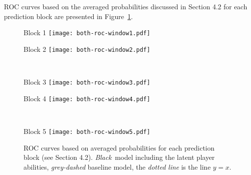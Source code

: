 \documentclass[11pt,a4paper]{article}
\begin{document}
ROC curves based on the averaged probabilities discussed in Section 4.2 
for each prediction block are presented in Figure~\ref{app_rocfig}.


\begin{figure}%
\hspace{-1.2cm}
\begin{minipage}[b]{0.48\linewidth}
        \centering
        \qquad\qquad\qquad\quad Block 1\vspace{0.01cm}
        \texttt{[image: both-roc-window1.pdf]}
\end{minipage} 
\hspace{0.72cm}
\begin{minipage}[b]{0.48\linewidth}
        \centering
        \qquad\qquad\qquad\quad Block 2\vspace{0.01cm}
        \texttt{[image: both-roc-window2.pdf]}
\end{minipage} \vspace{0.2cm}\\
\hspace*{-1.2cm}
\begin{minipage}[b]{0.48\linewidth}
        \centering
        \qquad\qquad\qquad\quad Block 3\vspace{0.01cm}
        \texttt{[image: both-roc-window3.pdf]}
\end{minipage} 
\hspace{0.72cm}
\begin{minipage}[b]{0.48\linewidth}
        \centering
        \qquad\qquad\qquad\quad Block 4\vspace{0.01cm}
        \texttt{[image: both-roc-window4.pdf]}
\end{minipage} \vspace{0.2cm}\\
\hspace*{-1.2cm}
\begin{minipage}[b]{0.48\linewidth}
        \centering
        \qquad\qquad\qquad\quad Block 5\vspace{0.01cm}
        \texttt{[image: both-roc-window5.pdf]}
\end{minipage}
      \caption{ROC curves based on averaged probabilities for each prediction block (see Section 4.2). \emph{Black}~model including the latent player abilities, \emph{grey-dashed} baseline model, the \emph{dotted line} is the line $y=x$.} \label{app_rocfig}
\end{figure} 






\newpage


\end{document}
